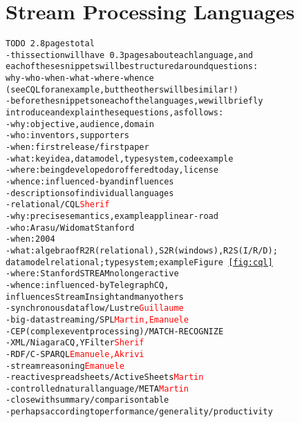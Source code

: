 \section{Stream Processing Languages}\label{sec:languages}



\begin{alltt}TODO\scriptsize ~2.8 pages total
- this section will have ~0.3 pages about each language, and
  each of these snippets will be structured around questions:
  why-who-when-what-where-whence
  (see CQL for an example, but the others will be similar!)
- before the snippets on each of the languages, we will briefly
  introduce and explain these questions, as follows:
  - why: objective, audience, domain
  - who: inventors, supporters
  - when: first release / first paper
  - what: key idea, data model, type system, code example
  - where: being developed or offered today, license
  - whence: influenced-by and influences
- descriptions of individual languages
  - relational / CQL \cite{arasu_babu_widom_2006}   \textcolor{red}{Sherif}
    - why: precise semantics \cite{arasu_widom_2004}, example app linear-road \cite{arasu_et_al_2004}
    - who: Arasu/Widom at Stanford
    - when: 2004
    - what: algebra of R2R (relational), S2R (windows), R2S (I/R/D);
      data model relational; type system \cite{soule_et_al_2016}; example Figure~\ref{fig:cql}
    - where: Stanford STREAM no longer active
    - whence: influenced-by TelegraphCQ \cite{chandrasekaran_et_al_2003},
      influences StreamInsight \cite{ali_et_al_2009} and many others
  - synchronous dataflow / Lustre \cite{caspi_et_al_1987} \textcolor{red}{Guillaume}
  - big-data streaming / SPL \cite{hirzel_schneider_gedik_2017} \textcolor{red}{Martin, Emanuele}
  - CEP (complex event processing) / MATCH-RECOGNIZE \cite{zemke_et_al_2007} \cite{hirzel_2012} \color{red}{Angela}
  - XML / NiagaraCQ \cite{chen_et_al_2000}, YFilter \cite{diao_et_al_2002} \textcolor{red}{Sherif}
  - RDF / C-SPARQL \cite{barbieri_et_al_2009} \textcolor{red}{Emanuele, Akrivi}
  - stream reasoning \textcolor{red}{Emanuele}
  - reactive spreadsheets / ActiveSheets \cite{vaziri_et_al_2014} \textcolor{red}{Martin}
  - controlled natural language / META \cite{arnold_et_al_2016} \textcolor{red}{Martin}
- close with summary/comparison table
  - perhaps according to performance/generality/productivity
\end{alltt}



